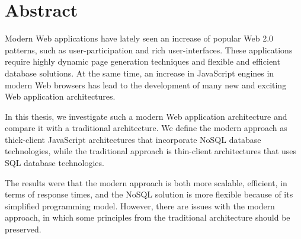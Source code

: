 \chapter*{Abstract}	%
Modern Web applications have lately seen an increase of popular Web 2.0 patterns, such as user-participation and rich user-interfaces. These applications require highly dynamic page generation techniques and flexible and efficient database solutions. At the same time, an increase in JavaScript engines in modern Web browsers has lead to the development of many new and exciting Web application architectures.

In this thesis, we investigate such a modern Web application architecture and compare it with a traditional architecture. We define the modern approach as thick-client JavaScript architectures that incorporate NoSQL database technologies, while the traditional approach is thin-client architectures that uses SQL database technologies. 

The results were that the modern approach is both more scalable, efficient, in terms of response times, and the NoSQL solution is more flexible because of its simplified programming model. However, there are issues with the modern approach, in which some principles from the traditional architecture should be preserved.